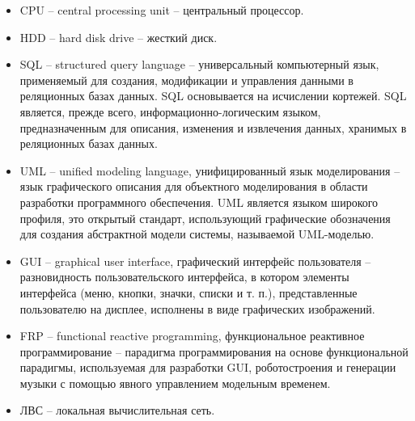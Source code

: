 \begin{itemize}
\item CPU -- central processing unit -- центральный процессор.
\item HDD -- hard disk drive -- жесткий диск.
\item SQL -- structured query language -- универсальный компьютерный язык, применяемый для создания, модификации и управления данными в реляционных базах данных. SQL основывается на исчислении кортежей. SQL является, прежде всего, информационно-логическим языком, предназначенным для описания, изменения и извлечения данных, хранимых в реляционных базах данных. 
\item UML -- unified modeling language, унифицированный язык моделирования -- язык графического описания для объектного моделирования в области разработки программного обеспечения. UML является языком широкого профиля, это открытый стандарт, использующий графические обозначения для создания абстрактной модели системы, называемой UML-моделью.
\item GUI -- graphical user interface, графический интерфейс пользователя -- разновидность пользовательского интерфейса, в котором элементы интерфейса (меню, кнопки, значки, списки и т. п.), представленные пользователю на дисплее, исполнены в виде графических изображений.
\item FRP -- functional reactive programming, функциональное реактивное программирование -- парадигма программирования на основе функциональной парадигмы, используемая для разработки GUI, роботостроения и генерации музыки с помощью явного управлением модельным временем.
\item ЛВС -- локальная вычислительная сеть.

\end{itemize}